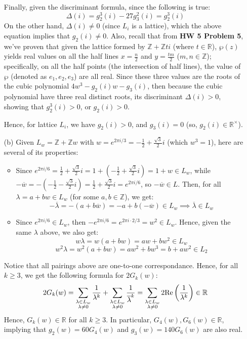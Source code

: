 \documentclass{article}
\begin{document}
\begin{itemize}
    Finally, given the discriminant formula, since the following is true:
    $$\Delta(i)=g_2^3(i)-27g_3^2(i) = g_2^3(i)$$
    On the other hand, $\Delta(i)\neq 0$ (since $L_i$ is a lattice), which the above equation implies that $g_2(i)\neq 0$.
    Also, recall that from \textbf{HW 5 Problem 5}, we've proven that given the lattice formed by $\mathbb{Z}+\mathbb{Z}ti$ (where $t\in\mathbb{R}$), $\wp(z)$ yields real values on all the half lines $x=\frac{n}{2}$ and $y=\frac{tm}{2}$ ($m,n\in\mathbb{Z}$); specifically, on all the half points (the intersection of half lines), the value of $\wp$ (denoted as $e_1,e_2,e_3$) are all real. Since these three values are the roots of the cubic polynomial $4w^3-g_2(i)w-g_3(i)$, then because the cubic polynomial have three real distinct roots, its discriminant $\Delta(i) >0$, showing that $g_2^3(i)>0$, or $g_2(i)>0$.

    Hence, for lattice $L_i$, we have $g_2(i)>0$, and $g_3(i)=0$ (so, $g_2(i)\in\mathbb{R}^\times$).

    \hfil
    
    \item[(b)] Given $L_w=\mathbb{Z}+\mathbb{Z}w$ with $w=e^{2\pi i/3} = -\frac{1}{2}+\frac{\sqrt{3}}{2}i$ (which $w^3 = 1$), here are several of its properties:
    \begin{itemize}
        \item Since $e^{2\pi i/6} = \frac{1}{2}+\frac{\sqrt{3}}{2}i = 1+(-\frac{1}{2}+\frac{\sqrt{3}}{2}i)= 1+w\in L_w$, while $-\overline{w} = -(-\frac{1}{2}-\frac{\sqrt{3}}{2}i) = \frac{1}{2}+\frac{\sqrt{3}}{2}i = e^{2\pi i/6}$, so $-\overline{w}\in L$. Then, for all $\lambda = a+bw\in L_w$ (for some $a,b\in\mathbb{Z}$), we get:
        $$-\overline{\lambda} = -(a+b\overline{w}) = -a+b(-\overline{w})\in L_w\implies\overline{\lambda}\in L_w$$
        \item Since $e^{2\pi i/6}\in L_w$, then $-e^{2\pi i/6} = e^{2\pi i\cdot2/3} = w^2\in L_w$. Hence, given the same $\lambda$ above, we also get:
        $$w\lambda = w(a+bw) = aw + bw^2 \in L_w$$
        $$w^2\lambda = w^2(a+bw) = aw^2+bw^3 = b+aw^2\in L_2$$
    \end{itemize}
    Notice that all pairings above are one-to-one correspondance. Hence, for all $k\geq 3$, we get the following formula for $2G_k(w)$:
    $$2G_k(w)=\sum_{\substack{\lambda\in L_w\\\lambda\neq 0}}\frac{1}{\lambda^k}+\sum_{\substack{\lambda\in L_w\\\lambda\neq 0}}\frac{1}{\overline{\lambda}^k} = \sum_{\substack{\lambda\in L_w\\\lambda\neq 0}}2\textmd{Re}\left(\frac{1}{\lambda^k}\right)\in \mathbb{R}$$ 
    Hence, $G_k(w)\in\mathbb{R}$ for all $k\geq 3$. In particular, $G_4(w),G_6(w)\in\mathbb{R}$, implying that $g_2(w)=60G_4(w)$ and $g_3(w)=140G_6(w)$ are also real.
    

\end{itemize}
\end{document}
